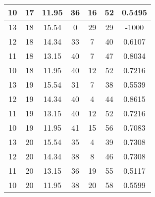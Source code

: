 \documentclass[letterpaper, 12pt]{article}
\begin{document}
\begin{longtable}{|c|c|c|c|c|c|c|}
10 & 17 & 11.95 & 36 & 16 & 52 & 0.5495 \\
\hline
13 & 18 & 15.54 & 0 & 29 & 29 & -1000 \\
\hline
12 & 18 & 14.34 & 33 & 7 & 40 & 0.6107 \\
\hline
11 & 18 & 13.15 & 40 & 7 & 47 & 0.8034 \\
\hline
10 & 18 & 11.95 & 40 & 12 & 52 & 0.7216 \\
\hline
13 & 19 & 15.54 & 31 & 7 & 38 & 0.5539 \\
\hline
12 & 19 & 14.34 & 40 & 4 & 44 & 0.8615 \\
\hline
11 & 19 & 13.15 & 40 & 12 & 52 & 0.7216 \\
\hline
10 & 19 & 11.95 & 41 & 15 & 56 & 0.7083 \\
\hline
13 & 20 & 15.54 & 35 & 4 & 39 & 0.7308 \\
\hline
12 & 20 & 14.34 & 38 & 8 & 46 & 0.7308 \\
\hline
11 & 20 & 13.15 & 36 & 19 & 55 & 0.5117 \\
\hline
10 & 20 & 11.95 & 38 & 20 & 58 & 0.5599 \\
\hline
\end{longtable}
\end{document}
